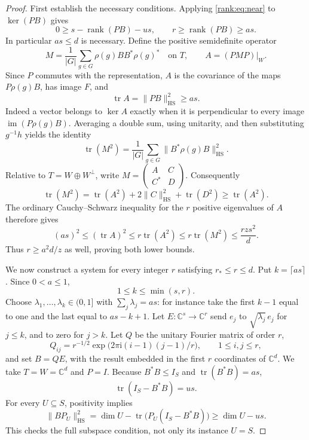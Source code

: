 \begin{proof}
First establish the necessary conditions. Applying
\eqref{rank:eq:near} to $\ker(PB)$ gives
\[
 0\ge s-\operatorname{rank}(PB)-us,
 \qquad r\ge\operatorname{rank}(PB)\ge as.
\]
In particular $as\le d$ is necessary. Define the positive semidefinite
operator
\[
 M=\frac1{|G|}\sum_{g\in G}\rho(g)BB^*\rho(g)^*\quad\text{on }T,
 \qquad A=(PMP)|_W.
\]
Since $P$ commutes with the representation, $A$ is the covariance of
the maps $P\rho(g)B$, has image $F$, and
\[
 \operatorname{tr}A=\|PB\|_{\mathrm{HS}}^2\ge as.
\]
Indeed a vector belongs to $\ker A$ exactly when it is perpendicular
to every image $\operatorname{im}(P\rho(g)B)$. Averaging a double sum,
using unitarity, and then substituting $g^{-1}h$ yields the identity
\[
 \operatorname{tr}(M^2)
   =\frac1{|G|}\sum_{g\in G}\|B^*\rho(g)B\|_{\mathrm{HS}}^2.
\]
Relative to $T=W\oplus W^\perp$, write
$M=\left(\begin{smallmatrix}A&C\\C^*&D\end{smallmatrix}\right)$.
Consequently
\[
 \operatorname{tr}(M^2)=\operatorname{tr}(A^2)
              +2\|C\|_{\mathrm{HS}}^2+\operatorname{tr}(D^2)
             \ge\operatorname{tr}(A^2).
\]
The ordinary Cauchy--Schwarz inequality for the $r$ positive
eigenvalues of $A$ therefore gives
\[
 (as)^2\le(\operatorname{tr}A)^2
       \le r\operatorname{tr}(A^2)
       \le r\operatorname{tr}(M^2)
       \le \frac{rzs^2}{d}.
\]
Thus $r\ge a^2d/z$ as well, proving both lower bounds.

We now construct a system for every integer $r$ satisfying
$r_*\le r\le d$. Put $k=\lceil as\rceil$. Since $0<a\le1$,
\[
              1\le k\le\min(s,r).
\]
Choose $\lambda_1,\ldots,\lambda_k\in(0,1]$ with
$\sum_j\lambda_j=as$: for instance take the first $k-1$ equal to one
and the last equal to $as-k+1$. Let $E:\mathbb C^s\to\mathbb C^r$
send $e_j$ to $\sqrt{\lambda_j}\,e_j$ for $j\le k$, and to zero for
$j>k$. Let $Q$ be the unitary Fourier matrix of order $r$,
\[
 Q_{ij}=r^{-1/2}\exp\bigl(2\pi\mathrm{i}(i-1)(j-1)/r\bigr),
          \qquad 1\le i,j\le r,
\]
and set $B=QE$, with the result embedded in the first $r$ coordinates
of $\mathbb C^d$. We take $T=W=\mathbb C^d$ and $P=I$.
Because $B^*B\le I_S$ and $\operatorname{tr}(B^*B)=as$,
\[
 \operatorname{tr}(I_S-B^*B)=us.
\]
For every $U\subseteq S$, positivity implies
\[
 \|BP_U\|_{\mathrm{HS}}^2
 =\dim U-\operatorname{tr}\bigl(P_U(I_S-B^*B)\bigr)
 \ge\dim U-us.
\]
This checks the full subspace condition, not only its instance $U=S$.


\end{proof}
